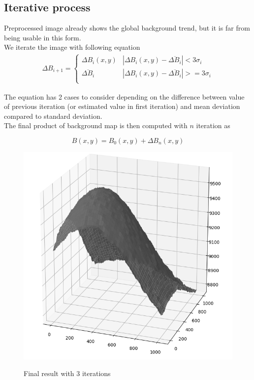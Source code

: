 \documentclass[12pt, a4paper, oneside]{book}
\begin{document}
\subsection{Iterative process}
Preprocessed image already shows the global background trend, but it is far from being usable in this form.\\
We iterate the image with following equation \\
\begin{gather}
    \Delta B_{i+1} =
    \begin{cases}
        \Delta B_i(x,y) & |\Delta B_i(x,y)-\overline{\Delta B_i}| < 3\sigma_i\\
        \overline{\Delta B_i}& |\Delta B_i(x,y)-\overline{\Delta B_i}| >= 3\sigma_i\\
    \end{cases}
\end{gather}

The equation has 2 cases to consider depending on the difference between value of previous iteration (or estimated value in first iteration) and mean deviation compared to standard deviation.\\
The final product of background map is then computed with $n$ iteration as

\begin{equation}
    B(x,y) = B_0(x,y) + \Delta B_n(x,y)
\end{equation}

\begin{figure}[H]
    \begin{center}
        \includegraphics[scale=1.50]{images/3_iter_sigma.png}
        \label{img:background_initial_guess}
        \caption{Final result with 3 iterations}
    \end{center}
\end{figure}
\end{document}
